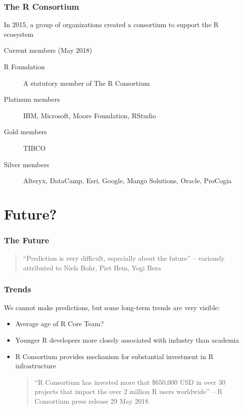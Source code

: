 \documentclass[svgnames]{beamer}
\begin{document}
\begin{frame}
  \frametitle{The R Consortium}

  In 2015, a group of organizations created a consortium to support
  the R ecosystem

  Current members (May 2018)
  \begin{description}
  \item [R Foundation] A statutory member of The R Consortium
  \item[Platinum members] IBM, Microsoft, Moore Foundation, RStudio
  \item[Gold members] TIBCO
  \item[Silver members] Alteryx, DataCamp, Esri, Google, Mango
    Solutions, Oracle, ProCogia
  \end{description}
  
\end{frame}

\section{Future?}

\begin{frame}
  \frametitle{The Future}

  \begin{quote}
    ``Prediction is very difficult, especially about the future''
    -- variously attributed to Niels Bohr, Piet Hein, Yogi Bera
  \end{quote}

\end{frame}

\begin{frame}
  \frametitle{Trends}

  We cannot make predictions, but some long-term trends are very visible:
  \begin{itemize}
  \item Average age of R Core Team?
  \item Younger R developers more closely associated with industry
    than academia
  \item R Consortium provides mechanism for substantial investment in
    R infrastructure
    \begin{quote}
      ``R Consortium has invested more that \$650,000 USD in over 30
      projects that impact the over 2 million R users worldwide'' -- R
      Consortium press release 29 May 2018.
    \end{quote}
  \end{itemize}
\end{frame}
\end{document}
